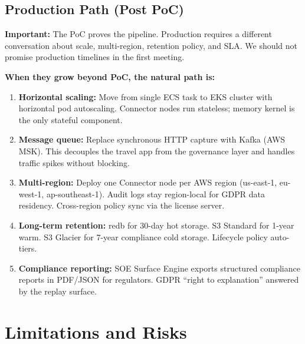 \documentclass[11pt, a4paper]{article}
\begin{document}
\subsection{Production Path (Post PoC)}

\begin{warnbox}
\textbf{Important:} The PoC proves the pipeline. Production requires a different conversation about scale, multi-region, retention policy, and SLA. We should not promise production timelines in the first meeting.
\end{warnbox}

\vspace{0.5em}

\textbf{When they grow beyond PoC, the natural path is:}

\begin{enumerate}[leftmargin=*, label=\textbf{Step \arabic*.}]
  \item \textbf{Horizontal scaling:} Move from single ECS task to EKS cluster with horizontal pod autoscaling. Connector nodes run stateless; memory kernel is the only stateful component.

  \item \textbf{Message queue:} Replace synchronous HTTP capture with Kafka (AWS MSK). This decouples the travel app from the governance layer and handles traffic spikes without blocking.

  \item \textbf{Multi-region:} Deploy one Connector node per AWS region (us-east-1, eu-west-1, ap-southeast-1). Audit logs stay region-local for GDPR data residency. Cross-region policy sync via the license server.

  \item \textbf{Long-term retention:} redb for 30-day hot storage. S3 Standard for 1-year warm. S3 Glacier for 7-year compliance cold storage. Lifecycle policy auto-tiers.

  \item \textbf{Compliance reporting:} SOE Surface Engine exports structured compliance reports in PDF/JSON for regulators. GDPR ``right to explanation'' answered by the replay surface.
\end{enumerate}

\newpage
\section{Limitations and Risks}
\end{document}
